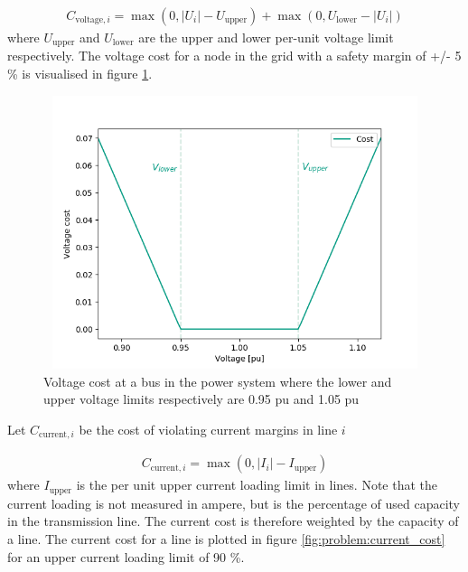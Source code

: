 \documentclass[class=book, crop=false, 11pt]{standalone}
\begin{document}
\begin{equation}
   \begin{aligned}
   \label{eq:problem:voltage_margins_cost}
    C_{\textrm{voltage},i} = \max(0,|U_{i}| - U_{\textrm{upper}}) + \max(0,U_{\textrm{lower}}- |U_{i}|)
    \end{aligned} 
\end{equation}
where $U_{\textrm{upper}}$ and $U_{\textrm{lower}}$ are the upper and lower per-unit voltage limit respectively. The voltage cost for a node in the grid with a safety margin of +/- 5 \%  is visualised in figure \ref{fig:problem:voltage_cost}.
\begin{figure}[ht]
    \center
\includegraphics[height=8cm, width=12cm]{figures/voltage_cost.png}
    \caption{Voltage cost at a bus in the power system where the lower and upper voltage limits respectively are 0.95 pu and 1.05 pu }
    \label{fig:problem:voltage_cost}
\end{figure}

Let $C_{\textrm{current},i}$ be the cost of violating current margins in line $i$

\begin{equation}
   \begin{aligned}
   \label{eq:problem:current_margins_cost}
    C_{\textrm{current},i} = \max(0,|I_{i}| - I_{\textrm{upper}})
    \end{aligned} 
\end{equation}
where $I_{\textrm{upper}}$ is the per unit upper current loading limit in lines. Note that the current loading is not measured in ampere, but is the percentage of used capacity in the transmission line. The current cost is therefore weighted by the capacity of a line. The current cost for a line is plotted in figure \ref{fig:problem:current_cost} for an upper current loading limit of 90 \%.
\end{document}
